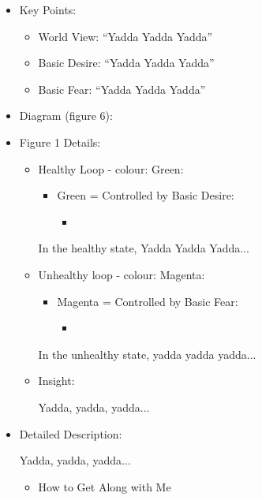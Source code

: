 \documentclass[openleft,oneside,showtrims]{memoir}
\begin{document}
\begin{itemize}
\item Key Points:
\label{sec:org752be5c}
\begin{itemize}
\item World View: ``Yadda Yadda Yadda''
\item Basic Desire: ``Yadda Yadda Yadda''
\item Basic Fear: ``Yadda Yadda Yadda''
\end{itemize}

\item Diagram (figure 6):
\label{sec:org913c39b}

\item Figure 1 Details:
\label{sec:orgef64e07}

\begin{itemize}
\item Healthy Loop - colour: Green:
\label{sec:org5ab9607}

\begin{itemize}
\item Green = Controlled by Basic Desire:
\begin{itemize}
\item 
\end{itemize}
\end{itemize}

In the healthy state, Yadda Yadda Yadda...

\item Unhealthy loop - colour: Magenta:
\label{sec:orgc77cd40}

\begin{itemize}
\item Magenta = Controlled by Basic Fear:

\begin{itemize}
\item 
\end{itemize}
\end{itemize}

In the unhealthy state, yadda yadda yadda...

\item Insight:
\label{sec:orgff39017}

Yadda, yadda, yadda...
\end{itemize}

\item Detailed Description:
\label{sec:org428fbf6}

Yadda, yadda, yadda...

\begin{itemize}
\item How to Get Along with Me
\label{sec:orga19895f}


\end{itemize}
\end{itemize}
\end{document}

